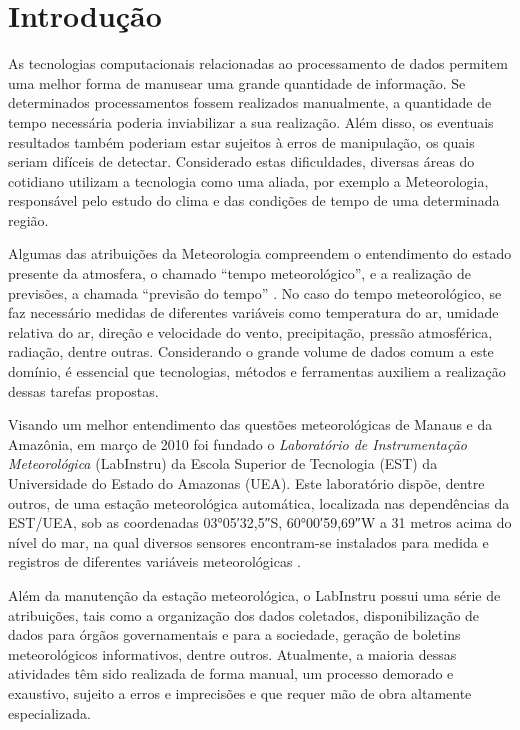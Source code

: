 \chapter{Introdução}

As tecnologias computacionais relacionadas ao processamento de dados permitem uma melhor forma de manusear uma grande quantidade de informação. Se determinados processamentos fossem realizados manualmente, a quantidade de tempo necessária poderia inviabilizar a sua realização. Além disso, os eventuais resultados também poderiam estar sujeitos à erros de manipulação, os quais seriam difíceis de detectar. Considerado estas dificuldades, diversas áreas do cotidiano utilizam a tecnologia como uma aliada, por exemplo a Meteorologia, responsável pelo estudo do clima e das condições de tempo de uma determinada região.

Algumas das atribuições da Meteorologia compreendem o entendimento do estado presente da atmosfera, o chamado ``tempo meteorológico'', e a realização de previsões, a chamada ``previsão do tempo'' \cite{Vianello:Livro}. No caso do tempo meteorológico, se faz necessário medidas de diferentes variáveis como temperatura do ar, umidade relativa do ar, direção e velocidade do vento, precipitação, pressão atmosférica, radiação, dentre outras. Considerando o grande volume de dados comum a este domínio, é essencial que tecnologias, métodos e ferramentas auxiliem a realização dessas tarefas propostas.

Visando um melhor entendimento das questões meteorológicas de Manaus e da Amazônia, em março de 2010 foi fundado o \emph{Laboratório de Instrumentação Meteorológica} (LabInstru) da Escola Superior de Tecnologia (EST) da Universidade do Estado do Amazonas (UEA). Este laboratório dispõe, dentre outros, de uma estação meteorológica automática, localizada nas dependências da EST/UEA, sob as coordenadas \ang{03;05;32,5}S, \ang{60;00;59,69}W a 31 metros acima do nível do mar, na qual diversos sensores encontram-se instalados para medida e registros de diferentes variáveis meteorológicas \cite{Labinstru:EST}.

Além da manutenção da estação meteorológica, o LabInstru possui uma série de atribuições, tais como a organização dos dados coletados, disponibilização de dados para órgãos governamentais e para a sociedade, geração de boletins meteorológicos informativos, dentre outros. Atualmente, a maioria dessas atividades têm sido realizada de forma manual, um processo demorado e exaustivo, sujeito a erros e imprecisões e que requer mão de obra altamente especializada.

